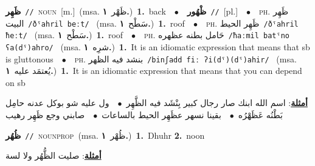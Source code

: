 \documentclass[10pt,a4paper,twoside]{article} %
\begin{document}
\begin{multicols}{2}
{\setlength\topsep{0pt}\textbf{\foreignlanguage{arabic}{ظَهِر}}\ {\color{gray}\texttt{//}\color{black}}\ \textsc{noun}\ [m.]\ \color{gray}(msa. \foreignlanguage{arabic}{ظَهْر}~\foreignlanguage{arabic}{\textbf{١.}})\color{black}\ \textbf{1.}~back\ \ $\bullet$\ \ \setlength\topsep{0pt}\textbf{\foreignlanguage{arabic}{ظْهُور}}\ {\color{gray}\texttt{//}\color{black}}\ [pl.]\ \ $\bullet$\ \ \textsc{ph.} \color{gray} \foreignlanguage{arabic}{ظَهِر البيت}\color{black}\ {\color{gray}\texttt{/{\sffamily ðˤahril beːt}/}\color{black}}\ \color{gray} (msa. \foreignlanguage{arabic}{سَطْح}~\foreignlanguage{arabic}{\textbf{١.}})\color{black}\ \textbf{1.}~roof\ \ $\bullet$\ \ \textsc{ph.} \color{gray} \foreignlanguage{arabic}{ظَهِر الحيط}\color{black}\ {\color{gray}\texttt{/{\sffamily ðˤahril ħeːt}/}\color{black}}\ \color{gray} (msa. \foreignlanguage{arabic}{سَطْح}~\foreignlanguage{arabic}{\textbf{١.}})\color{black}\ \textbf{1.}~roof\ \ $\bullet$\ \ \textsc{ph.} \color{gray} \foreignlanguage{arabic}{حَامل بطنه عظهره}\color{black}\ {\color{gray}\texttt{/{\sffamily ħaːmil batˤno ʕa(dˤ)ahro}/}\color{black}}\ \color{gray} (msa. \foreignlanguage{arabic}{شرِه}~\foreignlanguage{arabic}{\textbf{١.}})\color{black}\ \textbf{1.}~It is an idiomatic expression that means that sb is gluttonous\ \ $\bullet$\ \ \textsc{ph.} \color{gray} \foreignlanguage{arabic}{بنشد فيه الظهر}\color{black}\ {\color{gray}\texttt{/{\sffamily binʃadd fiː ʔi(dˤ)(dˤ)ahir}/}\color{black}}\ \color{gray} (msa. \foreignlanguage{arabic}{يُعتمَد عليه}~\foreignlanguage{arabic}{\textbf{١.}})\color{black}\ \textbf{1.}~It is an idiomatic expression that means that you can depend on sb\  \begin{flushright}\color{gray}\foreignlanguage{arabic}{\textbf{\underline{\foreignlanguage{arabic}{أمثلة}}}: اسم الله ابنك صار رجال كبير بِنْشَد فيه الظَّهِر\ $\bullet$\ \  ول عليه شو بوكل عدنه حامِل بَطْنُه عَظَهْرُه\ $\bullet$\ \  بقينا نسهر عظَهِر الحيط بالساعات\ $\bullet$\ \  صابني وجع ظَهِر رهيب}\end{flushright}\color{black}} \vspace{2mm}

{\setlength\topsep{0pt}\textbf{\foreignlanguage{arabic}{ظُهُر}}\ {\color{gray}\texttt{//}\color{black}}\ \textsc{noun\textunderscore prop}\ \color{gray}(msa. \foreignlanguage{arabic}{ظُهْر}~\foreignlanguage{arabic}{\textbf{١.}})\color{black}\ \textbf{1.}~Dhuhr  \textbf{2.}~noon\  \begin{flushright}\color{gray}\foreignlanguage{arabic}{\textbf{\underline{\foreignlanguage{arabic}{أمثلة}}}: صليت الظُّهُر ولا لسة}\end{flushright}\color{black}} \vspace{2mm}


\end{multicols}
\end{document}
